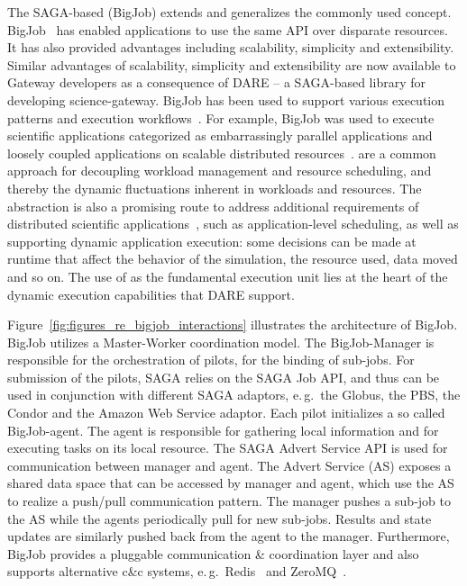 \documentclass[]{svjour3}
\begin{document}
The SAGA-based \pilotjob (BigJob) extends and generalizes the commonly
used \pilotjob
concept. BigJob~\cite{bigjob_web,saga_bigjob_condor_cloud} has enabled
applications to use the same \pilotjob API over disparate
resources. It has also provided advantages including scalability,
simplicity and extensibility. Similar advantages of scalability,
simplicity and extensibility are now available to Gateway developers
as a consequence of DARE – a SAGA-based library for developing
science-gateway.  BigJob has been used to support various execution
patterns and execution workflows~\cite{async_repex11,saga-royalsoc}.
For example, BigJob was used to execute scientific applications
categorized as embarrassingly parallel applications and loosely
coupled applications on scalable distributed
resources~\cite{ecmls_ccpe10, dare-ecmls11}. \pilotjobs are a common
approach for decoupling workload management and resource scheduling,
and thereby the dynamic fluctuations inherent in workloads and
resources. The \pilotjob abstraction is also a promising route to
address additional requirements of distributed scientific
applications~\cite{ko-efficient,bigjob_cloudcom10}, such as
application-level scheduling, as well as supporting dynamic
application execution: some decisions can be made at runtime that
affect the behavior of the simulation, the resource used, data moved
and so on.  The use of \pilotjobs as the fundamental execution unit
lies at the heart of the dynamic execution capabilities that DARE
support.

Figure~\ref{fig:figures_re_bigjob_interactions} illustrates the
architecture of BigJob. BigJob utilizes a Master-Worker coordination model. The
BigJob-Manager is responsible for the orchestration of pilots, for the
binding of sub-jobs. For submission of the pilots, SAGA relies on the
SAGA Job API, and thus can be used in conjunction with different SAGA
adaptors, e.\,g.\ the Globus, the PBS, the Condor and the Amazon Web
Service adaptor. Each pilot initializes a so called BigJob-agent. The
agent is responsible for gathering local information and for executing
tasks on its local resource. The SAGA Advert Service API is used for
communication between manager and agent. The Advert Service (AS)
exposes a shared data space that can be accessed by manager and agent,
which use the AS to realize a push/pull communication pattern.
The manager pushes a sub-job to the AS while the agents periodically pull
for new sub-jobs. Results and state updates are similarly pushed back from
the agent to the manager. Furthermore, BigJob provides a pluggable
communication \& coordination layer and also supports alternative c\&c
systems, e.\,g.\ Redis~\cite{redis} and ZeroMQ~\cite{zmq}.
\end{document}
